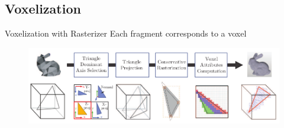 \documentclass[10pt]{beamer}
\begin{document}
\subsection{Voxelization}
\begin{frame}{Voxelization with Rasterizer}
  Each fragment corresponds to a voxel

  \begin{figure}
    \includegraphics[width=\textwidth]{rasterizedvoxelization}
  \end{figure}
\end{frame}
\end{document}
